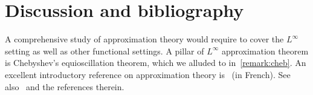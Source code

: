 \section{Discussion and bibliography}
A comprehensive study of approximation theory would require to cover the $L^{\infty}$ setting
as well as other functional settings.
A pillar of $L^{\infty}$ approximation theorem is Chebyshev's equioscillation theorem, which we alluded to in~\cref{remark:cheb}.
An excellent introductory reference on approximation theory is~\cite{magnus} (in French).
See also~\cite[Chapter 10]{MR2265914} and the references therein.
